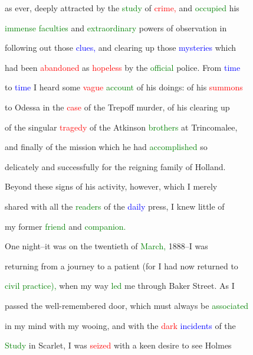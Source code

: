 as ever, deeply attracted by the \textcolor{green}{study} of \textcolor{red}{crime,} and \textcolor{green}{occupied} his

 \textcolor{green}{immense} \textcolor{green}{faculties} and \textcolor{green}{extraordinary} powers of observation in

 following out those \textcolor{blue}{clues,} and clearing up those \textcolor{blue}{mysteries} which

 had been \textcolor{red}{abandoned} as \textcolor{red}{hopeless} by the \textcolor{green}{official} \textcolor{BurntOrange}{police.} From \textcolor{blue}{time}

 to \textcolor{blue}{time} I heard some \textcolor{red}{vague} \textcolor{green}{account} of his doings: of his \textcolor{red}{summons}

 to Odessa in the \textcolor{red}{case} of the Trepoff \textcolor{BurntOrange}{murder,} of his clearing up

 of the singular \textcolor{red}{tragedy} of the Atkinson \textcolor{green}{brothers} at Trincomalee,

 and \textcolor{BurntOrange}{finally} of the mission which he had \textcolor{green}{accomplished} so

 delicately and successfully for the reigning family of Holland.

 Beyond these signs of his activity, however, which I merely

 \textcolor{BurntOrange}{shared} with all the \textcolor{green}{readers} of the \textcolor{blue}{daily} press, I knew little of

 my former \textcolor{green}{friend} and \textcolor{green}{companion.}



 One night--it was on the twentieth of \textcolor{green}{March,} 1888--I was

 returning from a \textcolor{BurntOrange}{journey} to a \textcolor{BurntOrange}{patient} (for I had now returned to

 \textcolor{green}{civil} \textcolor{green}{practice),} when my way \textcolor{green}{led} me through Baker Street. As I

 passed the well-remembered door, which must always be \textcolor{green}{associated}

 in my mind with my wooing, and with the \textcolor{red}{dark} \textcolor{blue}{incidents} of the

 \textcolor{green}{Study} in Scarlet, I was \textcolor{red}{seized} with a keen desire to see Holmes

